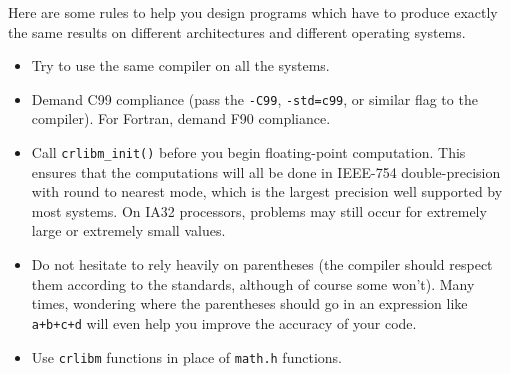 Here are some rules to help you design programs which have to
produce exactly the same results on different architectures and
different operating systems.
\begin{itemize}
\item Try to use the same compiler on all the systems.
\item Demand C99 compliance (pass the \texttt{-C99},
  \texttt{-std=c99}, or similar flag to the compiler). For Fortran,
  demand F90 compliance.
\item Call \texttt{crlibm\_init()} before you begin floating-point
  computation. This ensures that the computations will all be done in
  IEEE-754 double-precision with round to nearest mode, which is the
  largest precision well supported by most systems. On IA32
  processors, problems may still occur for extremely large or
  extremely small values.
\item Do not hesitate to rely heavily on parentheses (the compiler
  should respect them according to the standards, although of course some
  won't). Many times, wondering where the parentheses should go in an
  expression like \texttt{a+b+c+d} will even help you improve the
  accuracy of your code.
\item Use \texttt{crlibm} functions in place of \texttt{math.h} functions.
\end{itemize}




